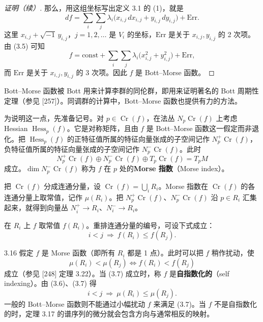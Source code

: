 \begin{proof}[证明（续）]
那么，用这组坐标写出定义 3.1 的 (1)，就是
\begin{equation}
  df=\sum_i\sum_j\lambda_i\bigl(x_{i,j}\,dx_{i,j}+y_{i,j}\,dy_{i,j}\bigr)+\mathrm{Err}. \tag{3.5}
\end{equation}
这里 $x_{i,j}+\sqrt{-1}\,y_{i,j}$，$j=1,2,\dots$ 是 $V_i$ 的坐标，$\mathrm{Err}$ 是关于 $x_{i,j},y_{i,j}$ 的 2 次项。由 (3.5) 可知
\[
  f=\mathrm{const}+\sum_i\sum_j\lambda_i\bigl(x_{i,j}^2+y_{i,j}^2\bigr)+\mathrm{Err},
\]
而 $\mathrm{Err}$ 是关于 $x_{i,j},y_{i,j}$ 的 3 次项。因此 $f$ 是 Bott–Morse 函数。
\end{proof}

Bott–Morse 函数被 Bott 用来计算李群的同伦群，即用来证明著名的 Bott 周期性定理（参见 [257]）。同调群的计算中，Bott–Morse 函数也提供有力的方法。

为说明这一点，先准备记号。对 $p\in\operatorname{Cr}(f)$，在法丛 $N_p\operatorname{Cr}(f)$ 上考虑 Hessian $\operatorname{Hess}_p(f)$。它是对称矩阵，且由 $f$ 是 Bott–Morse 函数这一假定而非退化。把 $\operatorname{Hess}_p(f)$ 的正特征值所属的特征向量张成的子空间记作 $N_p^{+}\operatorname{Cr}(f)$，负特征值所属的特征向量张成的子空间记作 $N_p^{-}\operatorname{Cr}(f)$。此时
\[
  N_p^{+}\operatorname{Cr}(f)\oplus N_p^{-}\operatorname{Cr}(f)\oplus T_p\operatorname{Cr}(f)=T_pM
\]
成立。$\dim N_p^{-}\operatorname{Cr}(f)$ 称为 $f$ 在 $p$ 处的\textbf{Morse 指数}（Morse index）。

把 $\operatorname{Cr}(f)$ 分成连通分量，设 $\operatorname{Cr}(f)=\bigcup_iR_i$。Morse 指数在 $\operatorname{Cr}(f)$ 的各连通分量上取常值，记作 $\mu(R_i)$。把 $N_p^{+}\operatorname{Cr}(f)$、$N_p^{-}\operatorname{Cr}(f)$ 沿 $p\in R_i$ 汇集起来，就得到向量丛 $N_i^{+}\to R_i$、$N_i^{-}\to R_i$。

在 $R_i$ 上 $f$ 取常值 $f(R_i)$。重排连通分量的编号，可设下式成立：
\begin{equation}
  i<j\ \Longrightarrow\ f(R_i)\le f(R_j). \tag{3.6}
\end{equation}

\begin{remark}{3.16}
  假定 $f$ 是 Morse 函数（即所有 $R_i$ 都是 1 点）。此时可以把 $f$ 稍作扰动，使
  \begin{equation}
    \mu(R_i)<\mu(R_j)\iff f(R_i)<f(R_j) \tag{3.7}
  \end{equation}
  成立（参见 [248] 定理 3.22）。当 (3.7) 成立时，称 $f$ 是\textbf{自指数化的}（self indexing）。由 (3.6)、(3.7) 得
  \begin{equation}
    i<j\ \Longrightarrow\ \mu(R_i)\le\mu(R_j). \tag{3.8}
  \end{equation}
  一般的 Bott–Morse 函数则不能通过小幅扰动 $f$ 来满足 (3.7)。当 $f$ 不是自指数化的时，定理 3.17 的谱序列的微分就会包含方向与通常相反的映射。
\end{remark}

